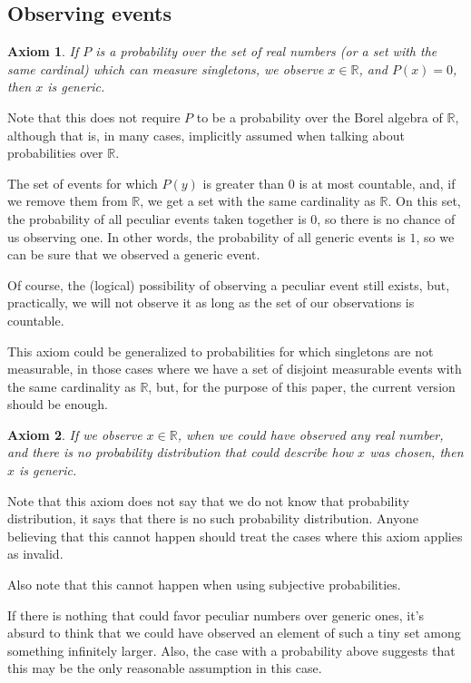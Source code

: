 \documentclass[a4paper
,draft
]{article}
\def\reale{\mathbb{R}}
\newtheorem{axiom}{Axiom}
\begin{document}
\subsection{Observing events}

\begin{axiom}
  If $P$ is a probability over the set of real numbers
  (or a set with the
  same cardinal) which can measure singletons,
  we observe $x\in\reale$, and $P(x)=0$, then $x$ is generic.
\end{axiom}

Note that this does not require $P$ to be a probability over the
Borel algebra of $\reale$, although that is, in many cases, implicitly
assumed when talking about probabilities over $\reale$.

The set of events for which $P(y)$ is
greater than $0$ is at most countable, and, if we remove them from $\reale$, we
get a set with the same cardinality as $\reale$. On this set, the probability
of all peculiar events taken together is $0$, so there is no chance of us
observing one. In other words, the probability of all generic events is $1$,
so we can be sure that we observed a generic event.

Of course, the (logical) possibility of observing a peculiar event still exists,
but, practically, we will not observe it as long as the set of our
observations is countable.

This axiom could be generalized to probabilities for which singletons are not
measurable, in those cases where we have a set of disjoint measurable events
with the same cardinality as $\reale$, but, for the purpose of this paper,
the current version should be enough.

\begin{axiom}\label{noprobability}
  If we observe $x\in\reale$, when we could have
  observed any real number, and there is no probability distribution that could
  describe how $x$ was chosen, then $x$ is generic.
\end{axiom}

Note that this axiom does not say that we do not know that probability
distribution, it says that there is no such probability distribution.
Anyone believing that this cannot happen should treat the cases where
this axiom applies as invalid.

Also note that this cannot happen when using subjective probabilities.

If there is nothing that could favor
peculiar numbers over generic ones, it's absurd to think that we could have
observed an element of such a tiny set among something infinitely larger.
Also, the case with a probability above suggests that this may be the only
reasonable assumption in this case.
\end{document}

